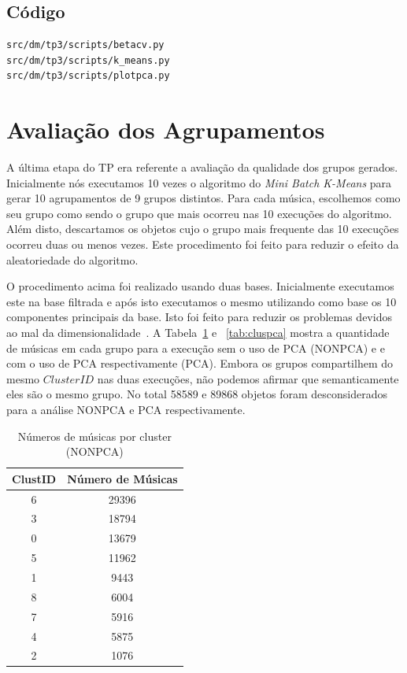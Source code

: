 \documentclass[brazil,a4paper,12pt]{article}
\begin{document}
\subsection{Código}

\begin{verbatim}
src/dm/tp3/scripts/betacv.py
src/dm/tp3/scripts/k_means.py
src/dm/tp3/scripts/plotpca.py
\end{verbatim}

\section{Avaliação dos Agrupamentos}

A última etapa do TP era referente a avaliação da qualidade dos grupos gerados. Inicialmente
nós executamos 10 vezes o algoritmo do \emph{Mini Batch K-Means} para gerar 10 agrupamentos
de 9 grupos distintos. Para cada música, escolhemos como seu grupo como sendo o grupo que mais
ocorreu nas 10 execuções do algoritmo. Além disto, descartamos os objetos cujo o grupo mais frequente
das 10 execuções ocorreu duas ou menos vezes. Este procedimento foi feito para reduzir o efeito da aleatoriedade do algoritmo.

O procedimento acima foi realizado usando duas bases. Inicialmente executamos este na base filtrada e
após isto executamos o mesmo utilizando como base os 10 componentes principais da base. Isto foi feito
para reduzir os problemas devidos ao mal da dimensionalidade~\cite{meira}. A Tabela~\ref{tab:clus} e 
~\ref{tab:cluspca} mostra a quantidade de músicas em cada grupo para a execução sem o uso de PCA (NONPCA) e e com o uso de PCA respectivamente (PCA). Embora os grupos compartilhem do mesmo
$ClusterID$ nas duas execuções, não podemos afirmar que semanticamente eles são o mesmo grupo.
No total 58589 e 89868 objetos foram desconsiderados para a análise NONPCA e PCA respectivamente.

\begin{table}
\centering
\small
\begin{tabular}{cc}
\toprule
ClustID & Número de Músicas  \\
\midrule
6	&	29396 \\
3	&	18794 \\
0	&	13679 \\
5	&	11962 \\
1	&	9443 \\
8	&	6004 \\
7	&	5916 \\
4	&	5875 \\
2	&	1076 \\
\bottomrule
\end{tabular}
\caption{Números de músicas por cluster (NONPCA)}
\label{tab:clus}
\end{table}
\end{document}
